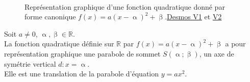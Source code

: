 \documentclass[main.tex]{subfiles}
\begin{document}
\begin{figure}[!h]
 \\
	\caption{Représentation graphique d'une fonction quadratique donné par forme canonique $f(x)=a(x-\upalpha)^2+\upbeta$.\href{https://www.desmos.com/calculator/ndteejmkxy}{Desmos V1} et \href{https://www.desmos.com/calculator/zypbljxm9p}{V2}
}
\end{figure}

\begin{proposition}  Soit $a\neq 0$, $\upalpha, \upbeta\in\mathbb{R}$. \\
	La fonction quadratique définie sur $\mathbb{R}$ par $f(x) = a (x-\upalpha)^2+\upbeta$ a pour représentation graphique une parabole de sommet $S(\upalpha; \upbeta)$, un axe de symétrie vertical $d\colon x = \upalpha$. \\
	Elle est une translation de la parabole d'équation $y=ax^2$.
\end{proposition} 
%	 
\end{document}
